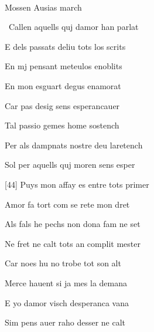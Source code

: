 \documentclass[12pt]{article}
\renewcommand{\espaiAbansEtiquetaPoema}{\vspace{0ex}}
\begin{document}
\begin{estrofa}

\espaiAbansEtiquetaPoema

\\

\begin{rubrica}

\textsection{} Mossen Ausias march \textsection{}

\end{rubrica}

\end{estrofa}


\begin{estrofa}

 \textparagraph\  Callen aquells quj damor han parlat

 E dels passats deliu tots los scrits

 En mj pensant meteulos enoblits

 En mon esguart degus enamorat

 Car pas desig sens esperancauer

 Tal passio gemes home sostench

 Per als dampnats nostre deu laretench

 Sol per aquells quj moren sens esper

\end{estrofa}



\begin{estrofa}

 [44] Puys mon affay es entre tots primer

 Amor fa tort com se rete mon dret

 Als fals he pechs non dona fam ne set

 Ne fret ne calt tots an complit mester

 Car noes hu no trobe tot son alt

 Merce hauent si ja mes la demana

 E yo damor visch desperanca vana

 Sim pens auer raho desser ne calt

\end{estrofa}
\end{document}

